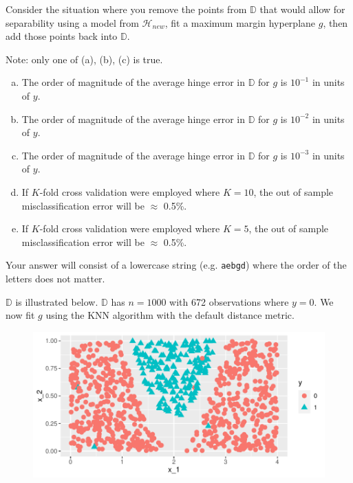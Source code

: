 \documentclass[12pt,landscape]{article}
\newcommand{\instr}{\small Your answer will consist of a lowercase string (e.g. \texttt{aebgd}) where the order of the letters does not matter. \normalsize}
\begin{document}
Consider the situation where you remove the points from $\mathbb{D}$ that would allow for separability using a model from $\mathcal{H}_{new}$, fit a maximum margin hyperplane $g$, then add those points back into $\mathbb{D}$.

Note: only one of (a), (b), (c) is true.

\begin{enumerate}[(a)]
\item The order of magnitude of the average hinge error in $\mathbb{D}$ for $g$ is $10^{-1}$ in units of $y$.
\item The order of magnitude of the average hinge error in $\mathbb{D}$ for $g$ is $10^{-2}$ in units of $y$.
\item The order of magnitude of the average hinge error in $\mathbb{D}$ for $g$ is $10^{-3}$ in units of $y$.
\item If $K$-fold cross validation were employed where $K=10$, the out of sample misclassification error will be $\approx$ 0.5\%.
\item If $K$-fold cross validation were employed where $K=5$, the out of sample misclassification error will be $\approx$ 0.5\%.
\end{enumerate}

%
\eenum\instr\pagebreak


\problem{} $\mathbb{D}$ is illustrated below. $\mathbb{D}$ has $n=1000$ with 672 observations where $y=0$. We now fit $g$ using the KNN algorithm with the default distance metric.

\begin{figure}[htp]
\centering
\includegraphics[width = 6in]{binary.pdf}\vspace{-0.4cm}
\end{figure}
\end{document}
